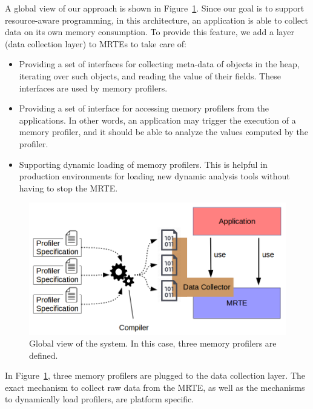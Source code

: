 A global view of our approach is shown in Figure~\ref{fig:dsl-global-view}.
Since our goal is to support resource-aware programming, in this architecture, an application is able to collect data on its own memory consumption.
To provide this feature, we add a layer (data collection layer) to MRTEs to take care of: 

\begin{itemize}
\item Providing a set of interfaces for collecting meta-data of objects in the heap, iterating over such objects, and reading the value of their fields.
These interfaces are used by memory profilers.

\item Providing a set of interface for accessing memory profilers from the applications.
In other words, an application may trigger the execution of a memory profiler, and it should be able to analyze the values computed by the profiler.

\item Supporting dynamic loading of memory profilers.
This is helpful in production environments for loading new dynamic analysis tools without having to stop the MRTE.
\end{itemize}

\begin{figure}[!ht]
\centering
\includegraphics[scale=0.4]{./chapter6/fig/global-view.png}
\caption{Global view of the system. In this case, three memory profilers are defined.}\label{fig:dsl-global-view}
\end{figure}

In Figure~\ref{fig:dsl-global-view}, three memory profilers are plugged to the data collection layer.
The exact mechanism to collect raw data from the MRTE, as well as the mechanisms to dynamically load profilers, are platform specific.

